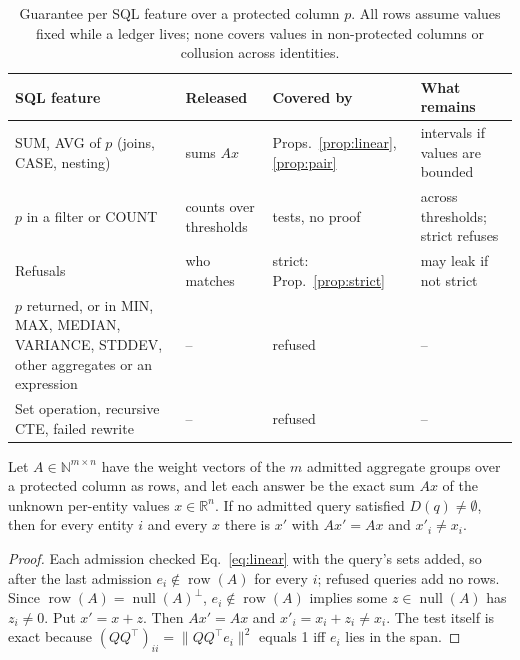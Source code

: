 \documentclass[sigconf,nonacm]{acmart}
\begin{document}
\begin{table}[!t]
\caption{Guarantee per SQL feature over a protected column $p$. All rows assume values fixed while a ledger lives; none covers values in non-protected columns or collusion across identities.}
\label{tab:guarantees}
\centering\scriptsize
\setlength{\tabcolsep}{2pt}
\begin{tabular}{@{}p{}p{}p{}p{}@{}}
\toprule
SQL feature & Released & Covered by & What remains\\
\midrule
SUM, AVG of $p$ (joins, CASE, nesting) & sums $Ax$ & Props.~\ref{prop:linear}, \ref{prop:pair} & intervals if values are bounded\\
$p$ in a filter or COUNT & counts over thresholds & tests, no proof & across thresholds; strict refuses\\
Refusals & who matches & strict: Prop.~\ref{prop:strict} & may leak if not strict\\
$p$ returned, or in MIN, MAX, MEDIAN, VARIANCE, STDDEV, other aggregates or an expression & -- & refused & --\\
Set operation, recursive CTE, failed rewrite & -- & refused & --\\
\bottomrule
\end{tabular}
\end{table}

\begin{proposition}\label{prop:linear}
Let $A\in\mathbb{N}^{m\times n}$ have the weight vectors of the $m$ admitted aggregate groups over a protected column as rows, and let each answer be the exact sum $Ax$ of the unknown per-entity values $x\in\mathbb{R}^n$. If no admitted query satisfied $D(q)\ne\emptyset$, then for every entity $i$ and every $x$ there is $x'$ with $Ax'=Ax$ and $x'_i\ne x_i$.
\end{proposition}
\begin{proof}
Each admission checked Eq.~\ref{eq:linear} with the query's sets added, so after the last admission $e_i\notin\operatorname{row}(A)$ for every $i$; refused queries add no rows. Since $\operatorname{row}(A)=\operatorname{null}(A)^{\perp}$, $e_i\notin\operatorname{row}(A)$ implies some $z\in\operatorname{null}(A)$ has $z_i\ne0$. Put $x'=x+z$. Then $Ax'=Ax$ and $x'_i=x_i+z_i\ne x_i$. The test itself is exact because $(QQ^{\top})_{ii}=\lVert QQ^{\top}e_i\rVert^2$ equals 1 iff $e_i$ lies in the span.
\end{proof}
\end{document}
